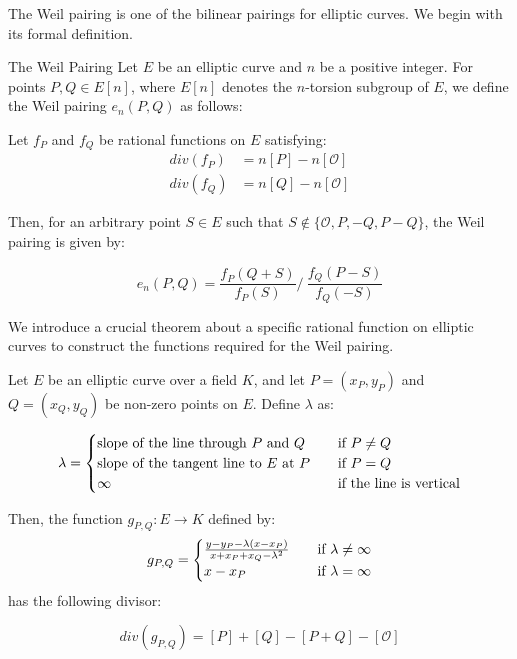 \documentclass{article}
\begin{document}
The Weil pairing is one of the bilinear pairings for elliptic curves. We begin with its formal definition.

\begin{definition}{The Weil Pairing}{}
    Let $E$ be an elliptic curve and $n$ be a positive integer. For points $P, Q \in E[n]$, where $E[n]$ denotes the $n$-torsion subgroup of $E$, we define the Weil pairing $e_n(P, Q)$ as follows:

    Let $f_P$ and $f_Q$ be rational functions on $E$ satisfying:
    \begin{align}
        div(f_P) &= n[P] - n[\mathcal{O}] \\
        div(f_Q) &= n[Q] - n[\mathcal{O}]
    \end{align}

    Then, for an arbitrary point $S \in E$ such that $S \notin \{\mathcal{O}, P, -Q, P-Q\}$, the Weil pairing is given by:

    \begin{equation}
    e_n(P, Q) = \frac{f_P(Q + S)}{f_P(S)} /\ \frac{f_Q(P - S)}{f_Q(-S)}
    \end{equation}
\end{definition}

We introduce a crucial theorem about a specific rational function on elliptic curves to construct the functions required for the Weil pairing.

\begin{theorem}{}{}
Let $E$ be an elliptic curve over a field $K$, and let $P = (x_P, y_P)$ and $Q = (x_Q, y_Q)$ be non-zero points on $E$. Define $\lambda$ as:

\begin{equation}
    \lambda = \begin{cases}
        \hbox{slope of the line through $P$ and $Q$} &\quad \hbox{if $P \neq Q$} \\
        \hbox{slope of the tangent line to $E$ at $P$} &\quad \hbox{if $P = Q$} \\
        \infty &\quad \hbox{if the line is vertical}
    \end{cases}
\end{equation}

Then, the function $g_{P,Q}: E \to K$ defined by:
\begin{equation}
g_{P,Q} = \begin{cases}
\frac{y - y_P - \lambda(x - x_P)}{x + x_P + x_Q - \lambda^2} &\quad \hbox{if } \lambda \neq \infty \\
x - x_P &\quad \hbox{if } \lambda = \infty
\end{cases}
\end{equation} has the following divisor:

\begin{equation}
div(g_{P,Q}) = [P] + [Q] - [P + Q] - [\mathcal{O}]
\end{equation}
\end{theorem}
\end{document}
